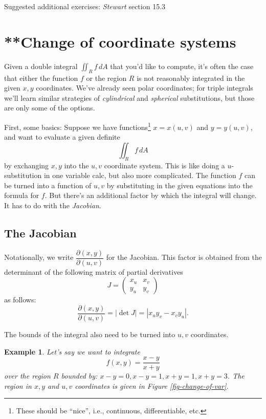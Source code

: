 \documentclass[12pt]{article}
\numberwithin{equation}{subsection}
\numberwithin{figure}{subsection}
\theoremstyle{note}
\newtheorem{example}[subsection]{Example}
\begin{document}
{\begin{enumerate}[label=\arabic*.]
\end{enumerate}
Suggested additional exercises: \textit{Stewart} section 15.3







\section{**Change of coordinate systems}

Given a double integral $\iint_R f\,dA$ that you'd like to compute, it's often the case that either the function $f$ or the region $R$ is not reasonably integrated in the given $x,y$ coordinates. We've already seen polar coordinates; for triple integrals we'll learn similar strategies of \textit{cylindrical} and \textit{spherical} substitutions, but those are only some of the options. 

First, some basics: Suppose we have functions\footnote{These should be ``nice'', i.e., continuous, differentiable, etc.} $x=x(u,v)$ and $y=y(u,v)$, and want to evaluate a given definite \[\iint_R f\,dA\] by exchanging $x,y$ into the $u,v$ coordinate system. This is like doing a $u$-substitution in one variable calc, but also more complicated. The function $f$ can be turned into a function of $u,v$ by substituting in the given equations into the formula for $f$. But there's an additional factor by which the integral will change. It has to do with the \textit{Jacobian}. 

\subsection{The Jacobian}\label{jacobian-def}
Notationally, we write $\dfrac{\partial(x,y)}{\partial(u,v)}$ for the Jacobian. This factor is obtained from the determinant of the following matrix of partial derivatives
\begin{equation} J= \begin{pmatrix} x_u & x_v \\ y_u & y_v \end{pmatrix}\end{equation}
as follows: \begin{equation} \dfrac{\partial(x,y)}{\partial(u,v)} =|\det J|= |x_u y_v - x_v y_u|.\end{equation}

The bounds of the integral also need to be turned into $u,v$ coordinates. 

\begin{example} Let's say we want to integrate \[f(x,y)=\dfrac{x-y}{x+y}\] over the region $R$ bounded by: $x-y=0, x-y=1, x+y=1, x+y=3$. The region in $x,y$ and $u,v$ coordinates is given in Figure \ref{fig-change-of-var}.


\end{example}}
\end{document}
